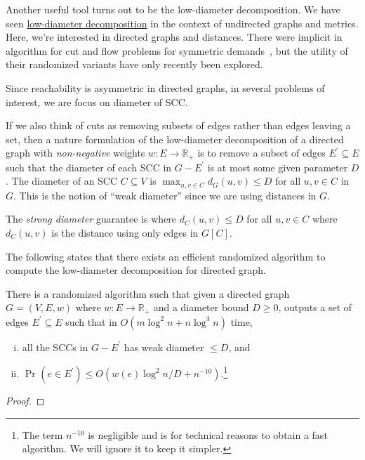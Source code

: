 Another useful tool turns out to be the low-diameter decomposition. We have seen \hyperref[def:low-diameter-decomposition]{low-diameter decomposition} in the context of undirected graphs and metrics. Here, we're interested in directed graphs and distances. There were implicit in algorithm for cut and flow problems for symmetric demands~\cite{klein1997approximation,seymour1995packing,even2000divide}, but the utility of their randomized variants have only recently been explored.

\begin{intuition}
	Since reachability is asymmetric in directed graphs, in several problems of interest, we are focus on diameter of SCC.
\end{intuition}

If we also think of cuts as removing subsets of edges rather than edges leaving a set, then a nature formulation of the low-diameter decomposition of a directed graph with \emph{non-negative} weights \(w\colon E \to \mathbb{R} _+\) is to remove a subset of edges \(E^{\prime} \subseteq E\) such that the diameter of each SCC in \(G - E^{\prime} \) is at most some given parameter \(D\). The diameter of an SCC \(C \subseteq V\) is \(\max _{u, v \in C} d_G(u, v) \leq D\) for all \(u, v \in C\) in \(G\). This is the notion of ``weak diameter'' since we are using distances in \(G\).

\begin{notation}\label{not:strong-diameter}
	The \emph{strong diameter} guarantee is where \(d_C(u, v) \leq D\) for all \(u, v \in C\) where \(d_C(u, v)\) is the distance using only edges in \(G[C]\).
\end{notation}

The following states that there exists an efficient randomized algorithm to compute the low-diameter decomposition for directed graph.

\begin{theorem}\label{thm:directed-LDD}
	There is a randomized algorithm such that given a directed graph \(G = (V, E, w)\) where \(w \colon E \to \mathbb{R} _+\) and a diameter bound \(D \geq 0\), outputs a set of edges \(E^{\prime} \subseteq E\) such that in \(O(m \log ^2 n + n \log ^3 n)\) time,
	\begin{enumerate}[(i)]
		\item all the SCCs in \(G - E^{\prime} \) has weak diameter \(\leq D\), and
		\item \(\Pr_{}(e \in E^{\prime} ) \leq O(w(e) \log ^2 n / D + n^{-10})\).\footnote{The term \(n^{-10}\) is negligible and is for technical reasons to obtain a fast algorithm. We will ignore it to keep it simpler.}
	\end{enumerate}
\end{theorem}
\begin{proof}
\end{proof}

